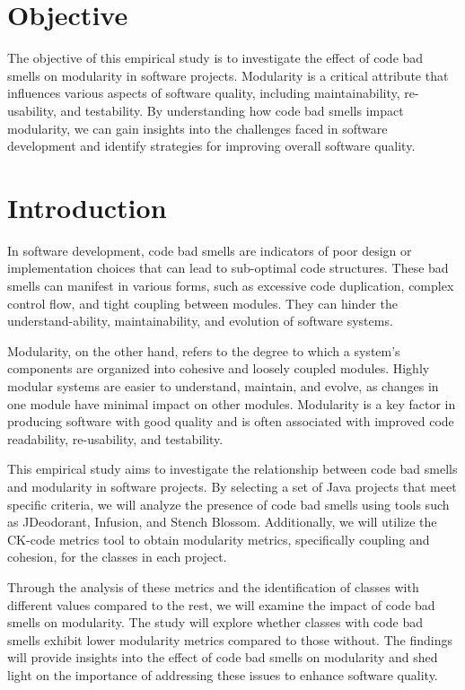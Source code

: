 \documentclass[conference]{IEEEtran}
\begin{document}
	\section{Objective}
	The objective of this empirical study is to investigate the effect of code bad smells on modularity in software projects. Modularity is a critical attribute that influences various aspects of software quality, including maintainability, re-usability, and testability. By understanding how code bad smells impact modularity, we can gain insights into the challenges faced in software development and identify strategies for improving overall software quality.
	
	\section{Introduction}
	In software development, code bad smells are indicators of poor design or implementation choices that can lead to sub-optimal code structures. These bad smells can manifest in various forms, such as excessive code duplication, complex control flow, and tight coupling between modules. They can hinder the understand-ability, maintainability, and evolution of software systems.
	
	Modularity, on the other hand, refers to the degree to which a system's components are organized into cohesive and loosely coupled modules. Highly modular systems are easier to understand, maintain, and evolve, as changes in one module have minimal impact on other modules. Modularity is a key factor in producing software with good quality and is often associated with improved code readability, re-usability, and testability.
	
	This empirical study aims to investigate the relationship between code bad smells and modularity in software projects. By selecting a set of Java projects that meet specific criteria, we will analyze the presence of code bad smells using tools such as JDeodorant, Infusion, and Stench Blossom. Additionally, we will utilize the CK-code metrics tool to obtain modularity metrics, specifically coupling and cohesion, for the classes in each project.
	
	Through the analysis of these metrics and the identification of classes with different values compared to the rest, we will examine the impact of code bad smells on modularity. The study will explore whether classes with code bad smells exhibit lower modularity metrics compared to those without. The findings will provide insights into the effect of code bad smells on modularity and shed light on the importance of addressing these issues to enhance software quality.
	
\end{document}
